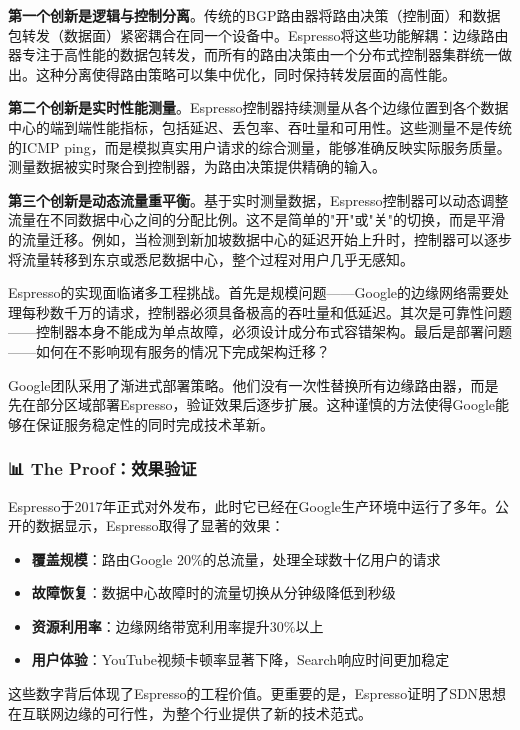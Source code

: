 \textbf{第一个创新是逻辑与控制分离}。传统的BGP路由器将路由决策（控制面）和数据包转发（数据面）紧密耦合在同一个设备中。Espresso将这些功能解耦：边缘路由器专注于高性能的数据包转发，而所有的路由决策由一个分布式控制器集群统一做出。这种分离使得路由策略可以集中优化，同时保持转发层面的高性能。

\textbf{第二个创新是实时性能测量}。Espresso控制器持续测量从各个边缘位置到各个数据中心的端到端性能指标，包括延迟、丢包率、吞吐量和可用性。这些测量不是传统的ICMP ping，而是模拟真实用户请求的综合测量，能够准确反映实际服务质量。测量数据被实时聚合到控制器，为路由决策提供精确的输入。

\textbf{第三个创新是动态流量重平衡}。基于实时测量数据，Espresso控制器可以动态调整流量在不同数据中心之间的分配比例。这不是简单的"开"或"关"的切换，而是平滑的流量迁移。例如，当检测到新加坡数据中心的延迟开始上升时，控制器可以逐步将流量转移到东京或悉尼数据中心，整个过程对用户几乎无感知。

Espresso的实现面临诸多工程挑战。首先是规模问题——Google的边缘网络需要处理每秒数千万的请求，控制器必须具备极高的吞吐量和低延迟。其次是可靠性问题——控制器本身不能成为单点故障，必须设计成分布式容错架构。最后是部署问题——如何在不影响现有服务的情况下完成架构迁移？

Google团队采用了渐进式部署策略。他们没有一次性替换所有边缘路由器，而是先在部分区域部署Espresso，验证效果后逐步扩展。这种谨慎的方法使得Google能够在保证服务稳定性的同时完成技术革新。

\subsubsection{📊 The Proof：效果验证}

Espresso于2017年正式对外发布，此时它已经在Google生产环境中运行了多年。公开的数据显示，Espresso取得了显著的效果：

\begin{itemize}
    \item \textbf{覆盖规模}：路由Google 20\%的总流量，处理全球数十亿用户的请求
    \item \textbf{故障恢复}：数据中心故障时的流量切换从分钟级降低到秒级
    \item \textbf{资源利用率}：边缘网络带宽利用率提升30\%以上
    \item \textbf{用户体验}：YouTube视频卡顿率显著下降，Search响应时间更加稳定
\end{itemize}

这些数字背后体现了Espresso的工程价值。更重要的是，Espresso证明了SDN思想在互联网边缘的可行性，为整个行业提供了新的技术范式。

